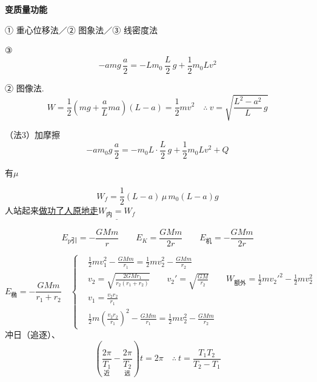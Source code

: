 \textbf{变质量功能}

① 重心位移法\quad／\quad ② 图象法\quad／\quad ③ 线密度法



③
\[ -a m g\,\frac{a}{2} = -L m_0\,\frac{L}{2}\,g + \frac{1}{2}m_0 L v^2 \]%

② 图像法.
\[ W=\frac{1}{2}\left(mg+\frac{a}{L}ma\right)(L-a)=\frac{1}{2}mv^2 \quad\therefore\ v=\sqrt{\frac{L^2-a^2}{L}\,g} \]%

（法3）加摩擦
\[ -a m_0 g\,\frac{a}{2} = -m_0 L\cdot\frac{L}{2}\,g + \frac{1}{2}m_0 L v^2 + Q \]

有$\mu$

\[ W_f=\frac{1}{2}(L-a)\,\mu\, m_0 (L-a) g \]
人站起来\underline{做功了}\quad \underline{人原地走}\quad $\underline{W_{\text{内}}=W_f}$
\begin{keybox}[天体功能]
\[ E_{\mathrm{p}\text{引}}=-\frac{GMm}{r}\qquad E_K=\frac{GMm}{2r}\qquad E_{\text{机}}=-\frac{GMm}{2r} \]
\end{keybox}

\[ E_{\text{椭}}=-\frac{GMm}{r_1+r_2}\quad
\left\{\begin{aligned}
& \frac{1}{2}mv_1^2-\frac{GMm}{r_1}=\frac{1}{2}mv_2^2-\frac{GMm}{r_2}\\
& v_2=\sqrt{\frac{2GMr_1}{r_2(r_1+r_2)}}\qquad v_2'=\sqrt{\frac{GM}{r_2}}\qquad W_{\text{额外}}=\frac{1}{2}mv_2'^2-\frac{1}{2}mv_2^2\\
& v_1=\frac{v_2 r_2}{r_1}\\
& \frac{1}{2}m\left(\frac{v_2 r_2}{r_1}\right)^2-\frac{GMm}{r_1}=\frac{1}{2}mv_2^2-\frac{GMm}{r_2}
\end{aligned}\right. \]
冲日（追逐）、
\[ \left(\underset{\text{近}}{\frac{2\pi}{T_1}}-\underset{\text{远}}{\frac{2\pi}{T_2}}\right)t=2\pi\quad\therefore\ t=\frac{T_1T_2}{T_2-T_1} \]

